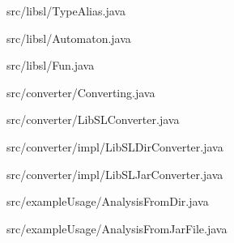 


{src/libsl/TypeAlias.java}


{src/libsl/Automaton.java}


{src/libsl/Fun.java}


{src/converter/Converting.java}


{src/converter/LibSLConverter.java}


{src/converter/impl/LibSLDirConverter.java}


{src/converter/impl/LibSLJarConverter.java}


{src/exampleUsage/AnalysisFromDir.java}


{src/exampleUsage/AnalysisFromJarFile.java}
